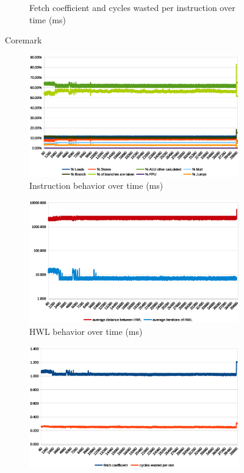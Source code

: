 \documentclass[../bachelor_paper.tex]{subfiles}
\begin{document}
\begin{figure}
\begin{subfigure}{0.45\textwidth}
        \caption{Fetch coefficient and cycles wasted per instruction over time (ms)}
    \end{subfigure}
    \caption{Coremark}
\end{figure}

\begin{figure}
    \begin{subfigure}{0.45\textwidth}
        \includegraphics[width=\textwidth]{img/graph/mibench/basicmath_inst.eps}
        \caption{Instruction behavior over time (ms)}
    \end{subfigure}
    \begin{subfigure}{0.45\textwidth}
        \includegraphics[width=\textwidth]{img/graph/mibench/basicmath_hwl.eps}
        \caption{\ac{HWL} behavior over time (ms)}
    \end{subfigure}
    \begin{subfigure}{0.45\textwidth}
        \includegraphics[width=\textwidth]{img/graph/mibench/basicmath_fetch_waste.eps}

\end{subfigure}
\end{figure}
\end{document}
